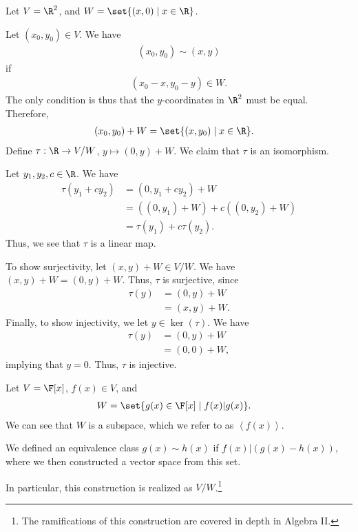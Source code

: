 \documentclass[10pt]{mypackage}
\begin{document}
\begin{example}
  Let $V = \R^2$, and $W = \set{\left(x,0\right)\mid x\in \R}$.\newline

  Let $\left(x_0,y_0\right)\in V$. We have
  \begin{align*}
  \left(x_0,y_0\right) \sim \left(x,y\right)
  \end{align*}
  if
  \begin{align*}
    \left(x_0 - x,y_0 - y\right)\in W.
  \end{align*}
  The only condition is thus that the $y$-coordinates in $\R^2$ must be equal. Therefore,
  \begin{align*}
    \left(x_0,y_0\right) + W &= \set{(x,y_0)\mid x\in\R}.
  \end{align*}
  Define $\tau: \R\rightarrow V/W$, $y\mapsto \left(0,y\right) + W$. We claim that $\tau$ is an isomorphism.\newline

  Let $y_1,y_2,c\in\R$. We have
  \begin{align*}
    \tau\left(y_1 + cy_2\right) &= \left(0,y_1 + cy_2\right) + W\\
                                &= \left(\left(0,y_1\right) + W\right) + c\left(\left(0,y_2\right) + W\right)\\
                                &= \tau\left(y_1\right) + c\tau\left(y_2\right).
  \end{align*}
  Thus, we see that $\tau$ is a linear map.\newline

  To show surjectivity, let $\left(x,y\right) + W\in V/W$. We have $\left(x,y\right) + W = \left(0,y\right) + W$. Thus, $\tau$ is surjective, since
  \begin{align*}
    \tau\left(y\right) &= \left(0,y\right) + W\\
                       &= \left(x,y\right) + W.
  \end{align*}
  Finally, to show injectivity, we let $y\in\ker\left(\tau\right)$. We have
  \begin{align*}
    \tau\left(y\right) &= \left(0,y\right) + W\\
                       &= \left(0,0\right) + W,
  \end{align*}
  implying that $y = 0$. Thus, $\tau$ is injective.
\end{example}
\begin{example}
  Let $V = \F[x]$, $f(x) \in V$, and
  \begin{align*}
    W &= \set{g(x)\in \F[x]\mid f(x)|g(x)}.
  \end{align*}
  We can see that $W$ is a subspace, which we refer to as $\left\langle f(x) \right\rangle$.\newline

  We defined an equivalence class $g(x) \sim h(x)$ if $f(x) | \left(g(x) - h(x)\right)$, where we then constructed a vector space from this set.\newline

  In particular, this construction is realized as $V/W$.\footnote{The ramifications of this construction are covered in depth in Algebra II.}
\end{example}
\end{document}
